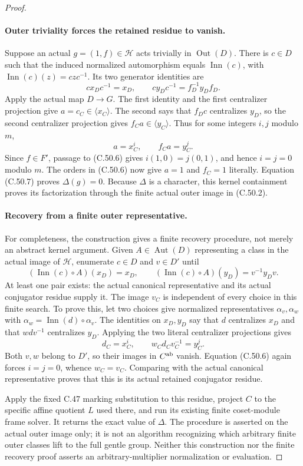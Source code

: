 \begin{proof}
\paragraph{Outer triviality forces the retained residue to vanish.}
Suppose an actual $g=(1,f)\in\mathcal H$ acts trivially in
$\operatorname{Out}(D)$. There is $c\in D$ such that the
induced normalized automorphism equals $\operatorname{Inn}(c)$,
with $\operatorname{Inn}(c)(z)=czc^{-1}$. Its two generator
identities are
\[
             cx_Dc^{-1}=x_D,\qquad
             c y_Dc^{-1}=f_D^{-1}y_Df_D.             \tag{C.50.11}
\]
Apply the actual map $D\to G$. The first identity and the first
centralizer projection give $a=c_C\in\langle x_C\rangle$.
The second says that $f_Dc$ centralizes $y_D$, so the second
centralizer projection gives $f_Ca\in\langle y_C\rangle$.
Thus for some integers $i,j$ modulo $m$,
\[
                     a=x_C^i,\qquad f_Ca=y_C^j.       \tag{C.50.12}
\]
Since $f\in F'$, passage to (C.50.6) gives
$i(1,0)=j(0,1)$, and hence $i=j=0$ modulo $m$.
The orders in (C.50.6) now give $a=1$ and $f_C=1$ literally.
Equation (C.50.7) proves $\Delta(g)=0$.
Because $\Delta$ is a character, this kernel containment proves
its factorization through the finite actual outer image in
(C.50.2).

\paragraph{Recovery from a finite outer representative.}
For completeness, the construction gives a finite recovery procedure,
not merely an abstract kernel argument. Given
$A\in\operatorname{Aut}(D)$ representing a class in the actual
image of $\mathcal H$, enumerate $c\in D$ and $v\in D'$ until
\[
 (\operatorname{Inn}(c)\circ A)(x_D)=x_D,\qquad
 (\operatorname{Inn}(c)\circ A)(y_D)=v^{-1}y_Dv.       \tag{C.50.13}
\]
At least one pair exists: the actual canonical representative and its
actual conjugator residue supply it. The image $v_C$ is independent
of every choice in this finite search. To prove this, let two choices
give normalized representatives $\alpha_v,\alpha_w$ with
$\alpha_w=\operatorname{Inn}(d)\circ\alpha_v$.
The identities on $x_D,y_D$ say that $d$ centralizes $x_D$
and that $wdv^{-1}$ centralizes $y_D$. Applying the two literal
centralizer projections gives
\[
                  d_C=x_C^i,\qquad w_Cd_Cv_C^{-1}=y_C^j.
                                                               \tag{C.50.14}
\]
Both $v,w$ belong to $D'$, so their images in $C^{\rm ab}$
vanish. Equation (C.50.6) again forces $i=j=0$, whence
$w_C=v_C$. Comparing with the actual canonical representative
proves that this is its actual retained conjugator residue.

Apply the fixed C.47 marking substitution to this residue, project
$C$ to the specific affine quotient $L$ used there, and run its
existing finite coset-module frame solver. It returns the exact
value of $\Delta$. The procedure is asserted on the actual outer
image only; it is not an algorithm recognizing which arbitrary
finite outer classes lift to the full gentle group. Neither this
construction nor the finite recovery proof asserts an
arbitrary-multiplier normalization or evaluation.
\end{proof}
